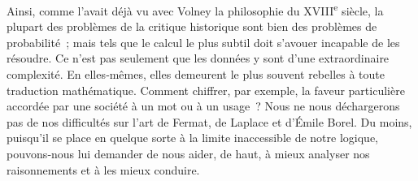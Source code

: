 \documentclass[french,twoside]{book} %
\newcommand{\astermono}{\medskip\centerline{\color{rubric}\large\selectfont{\syms ✻}}\medskip\par}%
\begin{document}
Ainsi, comme l’avait déjà vu avec Volney la philosophie du XVIII\textsuperscript{e} siècle, la plupart des problèmes de la critique historique sont bien des problèmes de probabilité ; mais tels que le calcul le plus subtil doit s’avouer incapable de les résoudre. Ce n’est pas seulement que les données y sont d’une extraordinaire complexité. En elles‑mêmes, elles demeurent le plus souvent rebelles à toute traduction mathématique. Comment chiffrer, par exemple, la faveur particulière accordée par une société à un mot ou à  
\label{p63} un usage ? Nous ne nous déchargerons pas de nos difficultés sur l’art de Fermat, de Laplace et d’Émile Borel. Du moins, puisqu’il se place en quelque sorte à la limite inaccessible de notre logique, pouvons‑nous lui demander de nous aider, de haut, à mieux analyser nos raisonnements et à les mieux conduire.\par

\astermono
\end{document}

